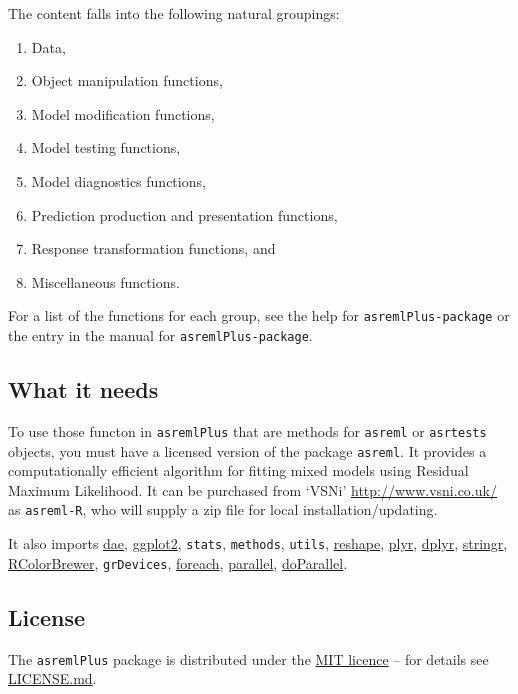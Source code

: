 \documentclass[
]{article}
\begin{document}
The content falls into the following natural groupings:

\begin{enumerate}
\def\labelenumi{(\roman{enumi})}
\item
  Data,
\item
  Object manipulation functions,
\item
  Model modification functions,
\item
  Model testing functions,
\item
  Model diagnostics functions,
\item
  Prediction production and presentation functions,
\item
  Response transformation functions, and
\item
  Miscellaneous functions.
\end{enumerate}

For a list of the functions for each group, see the help for
\texttt{asremlPlus-package} or the entry in the manual for
\texttt{asremlPlus-package}.

\hypertarget{what-it-needs}{%
\subsection{What it needs}\label{what-it-needs}}

To use those functon in \texttt{asremlPlus} that are methods for
\texttt{asreml} or \texttt{asrtests} objects, you must have a licensed
version of the package \texttt{asreml}. It provides a computationally
efficient algorithm for fitting mixed models using Residual Maximum
Likelihood. It can be purchased from `VSNi' \url{http://www.vsni.co.uk/}
as \texttt{asreml-R}, who will supply a zip file for local
installation/updating.

It also imports \href{https://CRAN.R-project.org/package=dae}{dae},
\href{https://CRAN.R-project.org/package=ggplot2}{ggplot2},
\texttt{stats}, \texttt{methods}, \texttt{utils},
\href{https://CRAN.R-project.org/package=reshape}{reshape},
\href{https://CRAN.R-project.org/package=plyr}{plyr},
\href{https://CRAN.R-project.org/package=dplyr}{dplyr},
\href{https://CRAN.R-project.org/package=stringr}{stringr},
\href{https://CRAN.R-project.org/package=RColorBrewer}{RColorBrewer},
\texttt{grDevices},
\href{https://CRAN.R-project.org/package=foreach}{foreach},
\href{https://CRAN.R-project.org/package=parallel}{parallel},
\href{https://CRAN.R-project.org/package=doParallel}{doParallel}.

\hypertarget{license}{%
\subsection{License}\label{license}}

The \texttt{asremlPlus} package is distributed under the
\href{https://opensource.org/licenses/MIT}{MIT licence} -- for details
see
\href{https://github.com/briencj/asremlPlus/blob/master/LICENSE.md}{LICENSE.md}.
\end{document}
